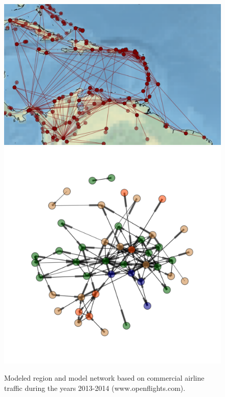 \documentclass[11pt]{article}
\begin{document}

\begin{figure}[ht]
\centering
\includegraphics[scale=.17]{./caribbean_region}
\hspace{.35cm}
\includegraphics[scale=.33]{./graph_region3_colored}
\caption{\small Modeled region and model network based on commercial airline traffic during the years 2013-2014 (www.openflights.com).}
\label{fig:map-and-network}
\end{figure}
\end{document}
